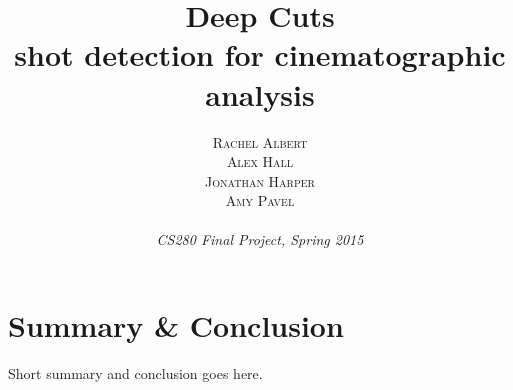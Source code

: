 \documentclass[a4paper, 10pt]{proc} %
\title{\textbf{Deep Cuts}\\ %
\Large{shot detection for cinematographic analysis}} %
\author{\textsc{Rachel Albert\\ Alex Hall\\ Jonathan Harper\\ Amy Pavel} %
\\{\textit{\\CS280 Final Project, Spring 2015}}} %
\makeatletter
\renewcommand{\maketitle}{ %
\begin{centering} %
{\huge\@title} %

\vspace{30pt} %

{\large\@author} %

\vspace{20pt} %
\end{centering}
}
\makeatother
\begin{document}
\maketitle %



%
%










\section*{Summary \& Conclusion}

Short summary and conclusion goes here.






\end{document}
